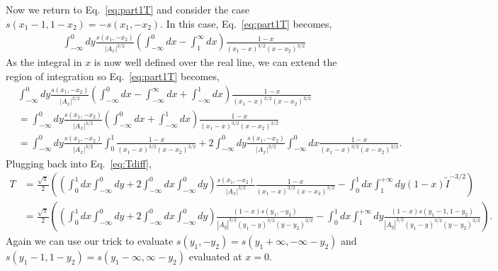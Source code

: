 \documentclass[twoside]{article}
\begin{document}
Now we return to Eq.~\eqref{eq:part1T} and consider the
case $s(x_1 - 1, 1-x_2) = -s(x_1,-x_2)$. In this case, Eq.~\eqref{eq:part1T} becomes,
\begin{align}
  \int^0_{-\infty}dy\frac{s(x_1, -x_2)}{|A_x|^{3/2}}\left( \int^0_{-\infty}dx - \int^{\infty}_1dx \right)\frac{1-x}{(x_1 - x)^{3/2}(x -
  x_2)^{3/2}}
\end{align}
As the integral in $x$ is now well defined over the real line, we can extend the region of integration so Eq.~\eqref{eq:part1T} becomes,
\begin{align}
  &\int^{0}_{-\infty}dy\frac{s(x_1, -x_2)}{|A_x|^{3/2}}\left( \int^0_{-\infty}dx - \int^{\infty}_{-\infty}dx + \int^{1}_{-\infty}dx
  \right)\frac{1-x}{(x_1 - x)^{3/2}(x-x_2)^{3/2}}\\
  &= \int^{0}_{-\infty}dy\frac{s(x_1, -x_2)}{|A_x|^{3/2}}\left( \int^{0}_{-\infty}dx + \int^{1}_{-\infty}dx \right)\frac{1-x}{(x_1 -
  x)^{3/2}(x - x_2)^{3/2}}\\
  &= \int^{0}_{-\infty}dy\frac{s(x_1, -x_2)}{|A_x|^{3/2}}\int^1_0\frac{1-x}{(x_1 - x)^{3/2}(x-x_2)^{3/2}} +
  2\int^0_{-\infty}dy\frac{s(x_1, -x_2)}{|A_x|^{3/2}}\int^0_{-\infty}dx \frac{1-x}{(x_1 - x)^{3/2}(x - x_2)^{3/2}}.
\end{align}
Plugging back into Eq.~\eqref{eq:Tdiff},
\begin{align}
  T &=  \frac{\sqrt{\pi}}{2}\left( \left(\int^{1}_{0}dx\int^{0}_{-\infty}dy + 2\int^0_{-\infty}dx\int^0_{-\infty}dy\right)\frac{s(x_1, -x_2)}{|A_x|^{3/2}}\frac{1-x}{(x_1 - x)^{3/2}(x -
  x_2)^{3/2}} - \int^1_0dx\int^{+\infty}_1dy(1-x)\tilde{I}^{-3/2} \right)\\
  &= \frac{\sqrt{\pi}}{2}\left( \left(\int^1_0dx\int^{0}_{-\infty}dy + 2\int^0_{-\infty}dx\int^{0}_{-\infty}dy\right)\frac{(1-x)s(y_1,-y_2)}{|A_y|^{3/2}(y_1 - y)^{3/2}(y - y_2)^{3/2}} -
  \int^1_0dx\int^{+\infty}_1dy\frac{(1-x)s(y_1 - 1, 1-y_2)}{|A_y|^{3/2}(y_1 - y)^{3/2}(y - y_2)^{3/2}} \right).
\end{align}
Again we can use our trick to evaluate $s(y_1, -y_2) = s(y_1 + \infty, -\infty - y_2)$ and $s(y_1 - 1, 1 - y_2) = s(y_1 - \infty, \infty -
y_2)$ evaluated at $x = 0$.
\end{document}
